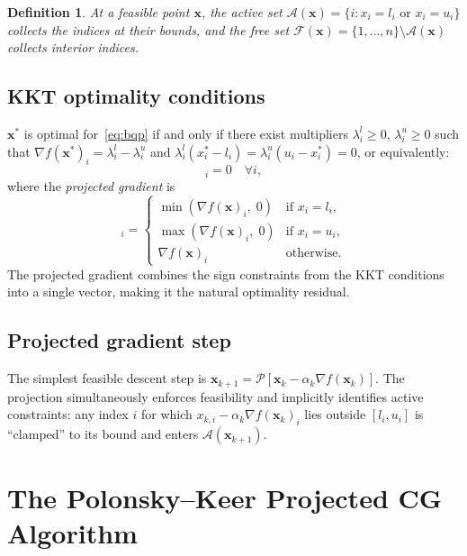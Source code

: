 \documentclass[11pt,a4paper]{article}
\newtheorem{definition}[theorem]{Definition}
\newcommand{\bx}{\mathbf{x}}
\newcommand{\Proj}{\mathcal{P}}
\newcommand{\calF}{\mathcal{F}}
\newcommand{\calA}{\mathcal{A}}
\begin{document}
\begin{definition}
  At a feasible point $\bx$, the \emph{active set}
  $\calA(\bx) = \{i : x_i = l_i \text{ or } x_i = u_i\}$ collects
  the indices at their bounds, and the \emph{free set}
  $\calF(\bx) = \{1,\ldots,n\} \setminus \calA(\bx)$ collects interior indices.
\end{definition}

\subsection{KKT optimality conditions}

$\bx^*$ is optimal for~\eqref{eq:bqp} if and only if there exist
multipliers $\lambda_i^l \geq 0$, $\lambda_i^u \geq 0$ such that
$\nabla f(\bx^*)_i = \lambda_i^l - \lambda_i^u$ and
$\lambda_i^l(x_i^* - l_i) = \lambda_i^u(u_i - x_i^*) = 0$,
or equivalently:
\begin{equation}
  [\nabla_P f(\bx^*)]_i = 0 \quad \forall i,
  \label{eq:kkt}
\end{equation}
where the \emph{projected gradient} is
\begin{equation}
  [\nabla_P f(\bx)]_i =
  \begin{cases}
    \min(\nabla f(\bx)_i,\; 0) & \text{if } x_i = l_i, \\
    \max(\nabla f(\bx)_i,\; 0) & \text{if } x_i = u_i, \\
    \nabla f(\bx)_i             & \text{otherwise.}
  \end{cases}
  \label{eq:proj-grad}
\end{equation}
The projected gradient combines the sign constraints from the KKT conditions
into a single vector, making it the natural optimality residual.

\subsection{Projected gradient step}

The simplest feasible descent step is
$\bx_{k+1} = \Proj[\bx_k - \alpha_k\nabla f(\bx_k)]$.
The projection simultaneously enforces feasibility and implicitly identifies
active constraints: any index $i$ for which $x_{k,i} - \alpha_k\nabla f(\bx_k)_i$
lies outside $[l_i, u_i]$ is ``clamped'' to its bound and enters $\calA(\bx_{k+1})$.

\section{The Polonsky--Keer Projected CG Algorithm}
\label{sec:polonsky}
\end{document}
